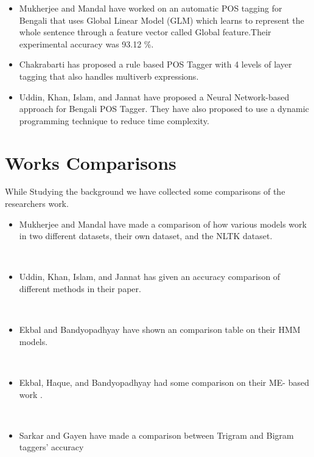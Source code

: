 \documentclass{standalone}
\begin{document}
\begin{itemize}
    \item Mukherjee and Mandal have worked on an automatic POS tagging for Bengali that uses Global Linear Model (GLM) which learns to represent the whole sentence through a feature vector called Global feature\cite{mukherjee}.Their experimental accuracy was 93.12 \%. \\
    \item Chakrabarti has proposed a rule based POS Tagger with 4 levels of layer tagging that also handles multiverb expressions.\cite{chakrabarti2011layered}\\
    \item Uddin, Khan, Islam, and Jannat have proposed a Neural Network-based approach for Bengali POS Tagger\cite{uddin}. They have also proposed to use a dynamic programming technique to reduce time complexity.\\
\end{itemize}


\section{Works Comparisons}
While Studying the background we have collected some comparisons of the researchers work.
\begin{itemize}
    \item Mukherjee and Mandal have made a comparison of how various models work in two different datasets, their own dataset, and the NLTK dataset\cite{mukherjee}.\\
    \vspace{.5cm}
    
\\
   \item Uddin, Khan, Islam, and Jannat has given an accuracy
    comparison of different methods in their paper\cite{uddin}.
    \vspace{.5cm}
    
\\
    \item Ekbal and  Bandyopadhyay have shown an comparison table on their HMM models.
\\
\vspace{.5cm}

\\
\item Ekbal, Haque, and Bandyopadhyay had some comparison on their ME- based work \cite{ekbal2008maximum}.\\
\vspace{.5cm}

\\
\item Sarkar and Gayen have made a comparison between Trigram and Bigram taggers’ accuracy \cite{sarkar}\\
\vspace{.5cm}

\end{itemize}
\end{document}
